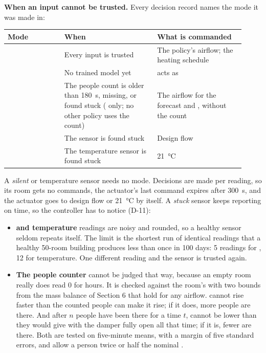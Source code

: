 \textbf{When an input cannot be trusted.} Every decision record names the mode
it was made in:

\begin{longtable}[]{@{}L{0.22\linewidth}L{0.36\linewidth}L{0.34\linewidth}@{}}
\toprule
\textbf{Mode} & \textbf{When} & \textbf{What is commanded} \\
\midrule
\endhead
{} & Every input is trusted & The policy's airflow; the heating schedule \\
 & No trained model yet &  acts as  \\
 & The people count is older than 180~s, missing, or found stuck ( only; no other policy uses the count) & The airflow for the forecast and \COtwo{}, without the count \\
 & The \COtwo{} sensor is found stuck & Design flow \\
 & The temperature sensor is found stuck & 21~°C \\
\bottomrule
\end{longtable}

A \emph{silent} \COtwo{} or temperature sensor needs no mode. Decisions are
made per reading, so its room gets no commands, the actuator's last command
expires after 300~s, and the actuator goes to design flow or 21~°C by itself.
A \emph{stuck} sensor keeps reporting on time, so the controller has to notice
(D-11):
\begin{itemize}
\tightlist
\item \textbf{\COtwo{} and temperature} readings are noisy and rounded, so a
  healthy sensor seldom repeats itself. The limit is the shortest run of
  identical readings that a healthy 50-room building produces less than once
  in 100 days: 5 readings for \COtwo{}, 12 for temperature. One different
  reading and the sensor is trusted again.
\item \textbf{The people counter} cannot be judged that way, because an empty
  room really does read 0 for hours. It is checked against the room's \COtwo{}
  with two bounds from the mass balance of Section 6 that hold for any
  airflow. \COtwo{} cannot rise faster than the counted people can make it
  rise; if it does, more people are there. And after $n$ people have been
  there for a time $t$, \COtwo{} cannot be lower than they would give with the
  damper fully open all that time; if it is, fewer are there. Both are tested
  on five-minute means, with a margin of five standard errors, and allow a
  person twice or half the nominal \COtwo{}.
\end{itemize}

